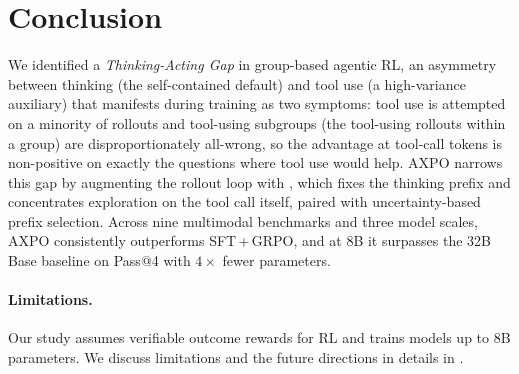 \section{Conclusion}
\label{sec:conclusion}

We identified a \emph{Thinking-Acting Gap} in group-based agentic RL, an asymmetry between thinking (the self-contained default) and tool use (a high-variance auxiliary) that manifests during training as two symptoms: tool use is attempted on a minority of rollouts and tool-using subgroups (the tool-using rollouts within a group) are disproportionately all-wrong, so the advantage at tool-call tokens is non-positive on exactly the questions where tool use would help. AXPO narrows this gap by augmenting the rollout loop with \emph{\toolresample}, which fixes the thinking prefix and concentrates exploration on the tool call itself, paired with uncertainty-based prefix selection. Across nine multimodal benchmarks and three model scales, AXPO consistently outperforms SFT\,+\,GRPO, and at 8B it surpasses the 32B Base baseline on Pass@4 with $4\times$ fewer parameters.

\paragraph{Limitations.}
Our study assumes verifiable outcome rewards for RL and trains models up to 8B parameters.
We discuss limitations and the future directions in details in .
